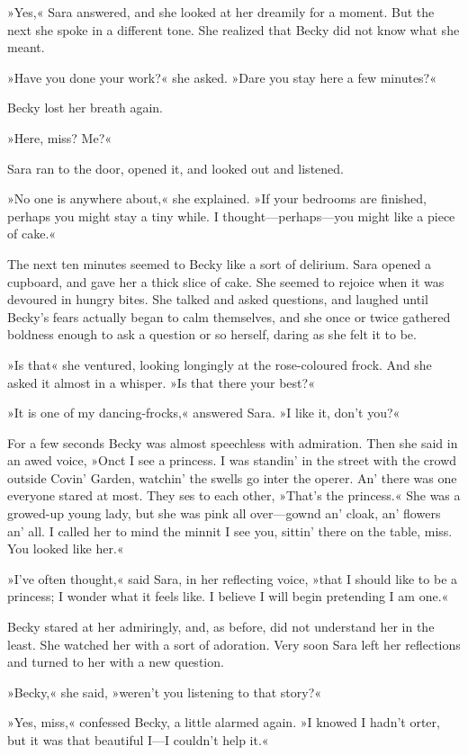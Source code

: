 »Yes,« Sara answered, and she looked at her dreamily for a moment. But the next she spoke in a different tone. She realized that Becky did not know what she meant.

»Have you done your work?« she asked. »Dare you stay here a few minutes?«

Becky lost her breath again.

»Here, miss? Me?«

Sara ran to the door, opened it, and looked out and listened.

»No one is anywhere about,« she explained. »If your bedrooms are finished, perhaps you might stay a tiny while. I thought—perhaps—you might like a piece of cake.«

The next ten minutes seemed to Becky like a sort of delirium. Sara opened a cupboard, and gave her a thick slice of cake. She seemed to rejoice when it was devoured in hungry bites. She talked and asked questions, and laughed until Becky's fears actually began to calm themselves, and she once or twice gathered boldness enough to ask a question or so herself, daring as she felt it to be.

»Is that\longdash« she ventured, looking longingly at the rose-coloured frock. And she asked it almost in a whisper. »Is that there your best?«

»It is one of my dancing-frocks,« answered Sara. »I like it, don't you?«

For a few seconds Becky was almost speechless with admiration. Then she said in an awed voice, »Onct I see a princess. I was standin' in the street with the crowd outside Covin' Garden, watchin' the swells go inter the operer. An' there was one everyone stared at most. They ses to each other, »That's the princess.« She was a growed-up young lady, but she was pink all over—gownd an' cloak, an' flowers an' all. I called her to mind the minnit I see you, sittin' there on the table, miss. You looked like her.«

»I've often thought,« said Sara, in her reflecting voice, »that I should like to be a princess; I wonder what it feels like. I believe I will begin pretending I am one.«

Becky stared at her admiringly, and, as before, did not understand her in the least. She watched her with a sort of adoration. Very soon Sara left her reflections and turned to her with a new question.

»Becky,« she said, »weren't you listening to that story?«

»Yes, miss,« confessed Becky, a little alarmed again. »I knowed I hadn't orter, but it was that beautiful I—I couldn't help it.«

